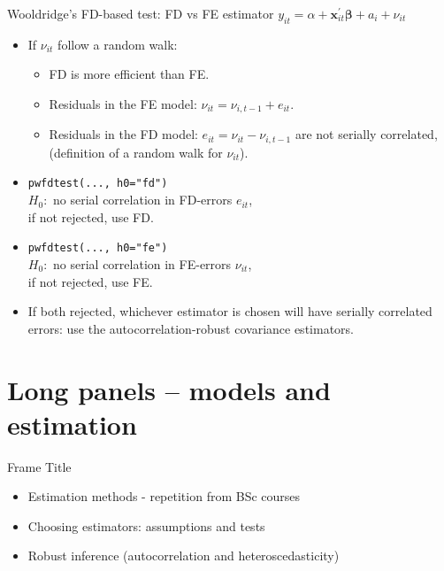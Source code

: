 \documentclass[usenames,dvipsnames]{beamer}
\begin{document}
\begin{frame}{Wooldridge's FD-based test: FD vs FE estimator}
$y_{it} = \alpha + \bm{x}^{\prime}_{it} \bm{\beta} + a_i + \nu_{it}$\\ \medskip
\begin{itemize}
    \item If $\nu_{it}$ follow a random walk: 
    \begin{itemize}
          \item FD is more efficient than FE.
          \item Residuals in the FE model: $\nu_{it}=\nu_{i,t-1}+e_{it}$.
          \item Residuals in the FD model: $e_{it} = \nu_{it}-\nu_{i,t-1}$ are not serially correlated, \\(definition of a random walk for $\nu_{it}$).
        \end{itemize}
        \smallskip
        \item \texttt{pwfdtest(..., h0="fd")} \\
        $H_0:$ no serial correlation in FD-errors $e_{it}$, \\if not rejected, use FD.
        \smallskip
        \item \texttt{pwfdtest(..., h0="fe")} \\
        $H_0:$ no serial correlation in FE-errors $\nu_{it}$, \\if not rejected, use FE.
        \smallskip
        \item If both rejected, whichever estimator is chosen will have serially correlated errors: use the autocorrelation-robust covariance estimators.
    \smallskip
\end{itemize}
\end{frame}



















\section{Long panels -- models and estimation}
\begin{frame}{Frame Title}
    \begin{itemize}
        \item Estimation methods - repetition from BSc courses
        \bigskip
        \item Choosing estimators: assumptions and tests
        \bigskip
        \item Robust inference (autocorrelation and heteroscedasticity)
    \end{itemize}
\end{frame}
\end{document}
